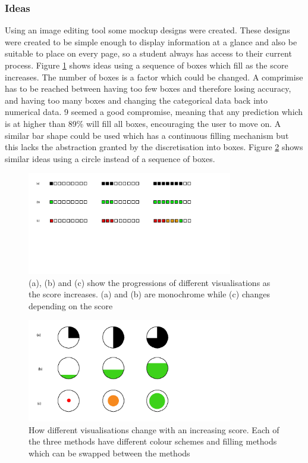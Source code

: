 \subsubsection{Ideas}
Using an image editing tool some mockup designs were created. These designs were created to be simple enough to display information at a glance and also be suitable to place on every page, so a student always has access to their current process. Figure \ref{fig:visualbar} shows ideas using a sequence of boxes which fill as the score increases. The number of boxes is a factor which could be changed. A comprimise has to be reached between having too few boxes and therefore losing accuracy, and having too many boxes and changing the categorical data back into numerical data. 9 seemed a good compromise, meaning that any prediction which is at higher than 89\% will fill all boxes, encouraging the user to move on. A similar bar shape could be used which has a continuous filling mechanism but this lacks the abstraction granted by the discretisation into boxes. Figure \ref{fig:visualcircles} shows similar ideas using a circle instead of a sequence of boxes. 

\begin{figure}[h!]
\centering
\includegraphics[width=0.8\textwidth]{images/visualbar.png}
\caption{(a), (b) and (c) show the progressions of different visualisations as the score increases. (a) and (b) are monochrome while (c) changes depending on the score}
\label{fig:visualbar}
\end{figure}

\begin{figure}[h!]
\centering
\includegraphics[width=0.8\textwidth]{images/visualcircles.png}
\caption{How different visualisations change with an increasing score. Each of the three methods have different colour schemes and filling methods which can be swapped between the methods}
\label{fig:visualcircles}
\end{figure}

